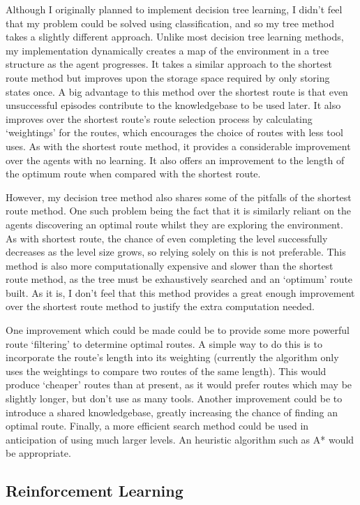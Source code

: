 \documentclass[a4paper,oneside]{report}
\begin{document}
Although I originally planned to implement decision tree learning, I didn't feel that my problem could be solved using classification, and so my tree method takes a slightly different approach. Unlike most decision tree learning methods, my implementation dynamically creates a map of the environment in a tree structure as the agent progresses. It takes a similar approach to the shortest route method but improves upon the storage space required by only storing states once. A big advantage to this method over the shortest route is that even unsuccessful episodes contribute to the knowledgebase to be used later. It also improves over the shortest route's route selection process by calculating `weightings' for the routes, which encourages the choice of routes with less tool uses. As with the shortest route method, it provides a considerable improvement over the agents with no learning. It also offers an improvement to the length of the optimum route when compared with the shortest route. 

However, my decision tree method also shares some of the pitfalls of the shortest route method. One such problem being the fact that it is similarly reliant on the agents discovering an optimal route whilst they are exploring the environment. As with shortest route, the chance of even completing the level successfully decreases as the level size grows, so relying solely on this is not preferable. This method is also more computationally expensive and slower than the shortest route method, as the tree must be exhaustively searched and an `optimum' route built. As it is, I don't feel that this method provides a great enough improvement over the shortest route method to justify the extra computation needed.

One improvement which could be made could be to provide some more powerful route `filtering' to determine optimal routes. A simple way to do this is to incorporate the route's length into its weighting (currently the algorithm only uses the weightings to compare two routes of the same length). This would produce `cheaper' routes than at present, as it would prefer routes which may be slightly longer, but don't use as many tools. Another improvement could be to introduce a shared knowledgebase, greatly increasing the chance of finding an optimal route. Finally, a more efficient search method could be used in anticipation of using much larger levels. An heuristic algorithm such as A* would be appropriate.

\subsection{Reinforcement Learning}
\end{document}
